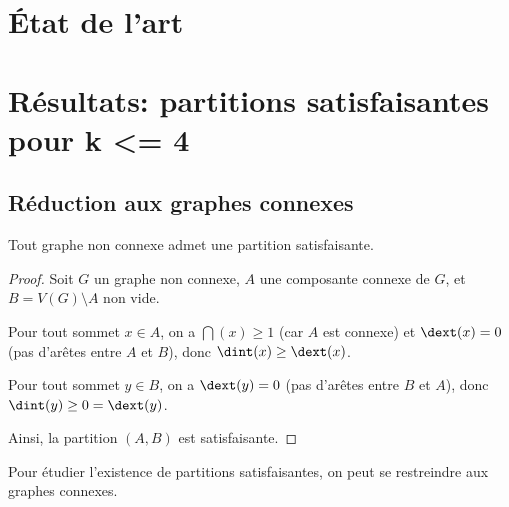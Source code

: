 

\section{État de l'art}\label{sec:art}
%
%



\section{Résultats: partitions satisfaisantes pour k <= 4}\label{sec:results}

\subsection{Réduction aux graphes connexes}\label{subsec:connected}

\begin{proposition}
    Tout graphe non connexe admet une partition satisfaisante.
\end{proposition}

\begin{proof}
    Soit \(G\) un graphe non connexe, \(A\) une composante connexe de \(G\), et \(B = V(G) \setminus A\) non vide.

    Pour tout sommet \(x \in A\), on a \(\dint(x) \geq 1\) (car \(A\) est connexe) et \(\dext(x) = 0\) (pas d'arêtes entre \(A\) et \(B\)), donc \(\dint(x) \geq \dext(x)\).

    Pour tout sommet \(y \in B\), on a \(\dext(y) = 0\) (pas d'arêtes entre \(B\) et \(A\)), donc \(\dint(y) \geq 0 = \dext(y)\).

    Ainsi, la partition \((A, B)\) est satisfaisante.
\end{proof}

\begin{corollaire}
    Pour étudier l'existence de partitions satisfaisantes, on peut se restreindre aux graphes connexes.
\end{corollaire}



